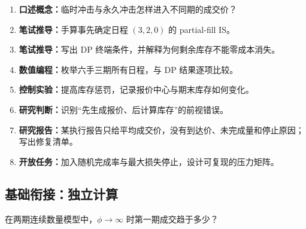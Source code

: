 \begin{enumerate}[leftmargin=*]
  \item \textbf{口述概念：}临时冲击与永久冲击怎样进入不同期的成交价？
  \item \textbf{笔试推导：}手算事先确定日程 $(3,2,0)$ 的 partial-fill IS。
  \item \textbf{笔试推导：}写出 DP 终端条件，并解释为何剩余库存不能零成本消失。
  \item \textbf{数值编程：}枚举六手三期所有日程，与 DP 结果逐项比较。
  \item \textbf{控制实验：}提高库存惩罚，记录报价中心与期末库存如何变化。
  \item \textbf{研究判断：}识别“先生成报价、后计算库存”的前视错误。
  \item \textbf{研究报告：}某执行报告只给平均成交价，没有到达价、未完成量和停止原因；写出修复清单。
  \item \textbf{开放任务：}加入随机完成率与最大损失停止，设计可复现的压力矩阵。
\end{enumerate}

\subsection*{基础衔接：独立计算}
在两期连续数量模型中，$\phi\to\infty$ 时第一期成交趋于多少？
